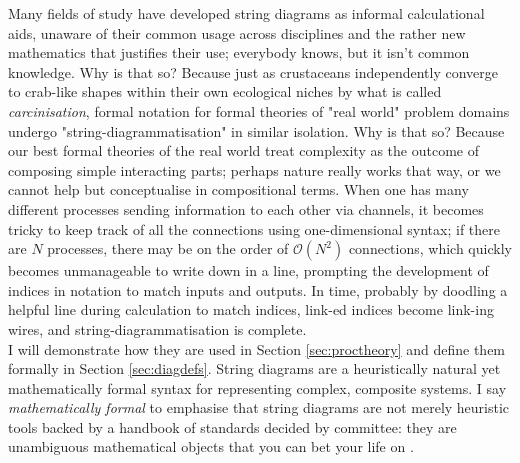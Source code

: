 Many fields of study have developed string diagrams as informal calculational aids, unaware of their common usage across disciplines and the rather new mathematics that justifies their use; everybody knows, but it isn't common knowledge. Why is that so? Because just as crustaceans independently converge to crab-like shapes within their own ecological niches by what is called \emph{carcinisation}, formal notation for formal theories of "real world" problem domains undergo "string-diagrammatisation" in similar isolation. Why is that so? Because our best formal theories of the real world treat complexity as the outcome of composing simple interacting parts; perhaps nature really works that way, or we cannot help but conceptualise in compositional terms. When one has many different processes sending information to each other via channels, it becomes tricky to keep track of all the connections using one-dimensional syntax; if there are $N$ processes, there may be on the order of $\mathcal{O}(N^2)$ connections, which quickly becomes unmanageable to write down in a line, prompting the development of indices in notation to match inputs and outputs. In time, probably by doodling a helpful line during calculation to match indices, link-ed indices become link-ing wires, and string-diagrammatisation is complete.\\

I will demonstrate how they are used in Section \ref{sec:proctheory} and define them formally in Section \ref{sec:diagdefs}. String diagrams are a heuristically natural yet mathematically formal syntax for representing complex, composite systems. I say \emph{mathematically formal} to emphasise that string diagrams are not merely heuristic tools backed by a handbook of standards decided by committee: they are unambiguous mathematical objects that you can bet your life on \citep{joyal_geometry_1991,joyal_geometry_nodate,maclane_natural_1963,lane_categories_2010,selinger_survey_2010}.

